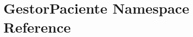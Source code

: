 \hypertarget{namespace_gestor_paciente}{}\section{Gestor\+Paciente Namespace Reference}
\label{namespace_gestor_paciente}
